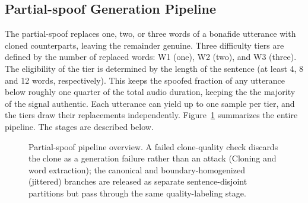 \documentclass[11pt]{article}
\begin{document}
\FloatBarrier
\subsection*{Partial-spoof Generation Pipeline}

The partial-spoof replaces one, two, or three words of a bonafide
utterance with cloned counterparts, leaving the remainder genuine. Three
difficulty tiers are defined by the number of replaced words: W1 (one),
W2 (two), and W3 (three). The eligibility of the tier is determined by the length of the sentence (at least 4, 8 and 12 words, respectively). 
This keeps the spoofed fraction of any utterance below roughly one quarter of the total audio duration, keeping the the majority of the signal authentic. Each utterance can yield up to one sample per tier, and the tiers draw their replacements independently. 
Figure~\ref{fig:partialpipeline} summarizes the entire pipeline. The stages are described below.

\begin{figure}[t]
\centering
{}
\caption{Partial-spoof pipeline overview. A failed clone-quality check
discards the clone as a generation failure rather than an attack
(Cloning and word extraction); the canonical and boundary-homogenized
(jittered) branches are released as separate sentence-disjoint
partitions but pass through the same quality-labeling stage.}
\label{fig:partialpipeline}
\end{figure}
\end{document}
